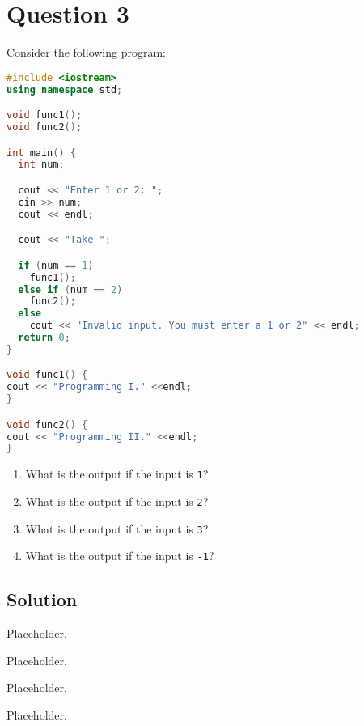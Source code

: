 \documentclass[a4paper, 11pt]{article}
\begin{document}
    
  \newpage
  \section{Question 3}
    Consider the following program:

    \begin{lstlisting}[language=c++,caption={Question 3 Problem}]
#include <iostream>
using namespace std;

void func1();
void func2();

int main() {
  int num;

  cout << "Enter 1 or 2: ";
  cin >> num;
  cout << endl;

  cout << "Take ";

  if (num == 1)
    func1();
  else if (num == 2)
    func2();
  else
    cout << "Invalid input. You must enter a 1 or 2" << endl;
  return 0;
}

void func1() {
cout << "Programming I." <<endl;
}

void func2() {
cout << "Programming II." <<endl;
}
    \end{lstlisting}

    \begin{enumerate}[label=\Alph*.]
      \item What is the output if the input is \texttt{1}?
      \item What is the output if the input is \texttt{2}?
      \item What is the output if the input is \texttt{3}?
      \item What is the output if the input is \texttt{-1}?
    \end{enumerate}
    
    \subsection{Solution}
      \begin{enumerate}[label=\alph*.]
        \begin{minipage}{0.45\textwidth}
          \item \begin{mdframed}[style=AnswerFrame]
            Placeholder.
            \end{mdframed}
          \item \begin{mdframed}[style=AnswerFrame]
            Placeholder.
            \end{mdframed}
        \end{minipage}\hfill
        \begin{minipage}{.45\textwidth}
          \item \begin{mdframed}[style=AnswerFrame]
            Placeholder.
            \end{mdframed}
          \item \begin{mdframed}[style=AnswerFrame]
            Placeholder.
            \end{mdframed}
        \end{minipage}
      \end{enumerate}
\end{document}
